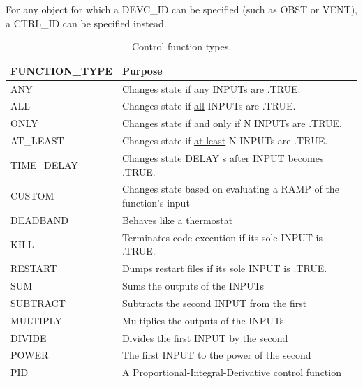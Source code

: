 \documentclass[11pt]{book}
\begin{document}
For any object for which a {\ct DEVC\_ID} can be specified (such as {\ct OBST} or {\ct VENT}), a {\ct CTRL\_ID} can be
specified instead.

\begin{table}[h!]
\caption[Control function types]{Control function types.}
\label{tab:funcvalues}
\begin{center}
\begin{tabular}{|l||l|}
\hline
{\ct FUNCTION\_TYPE}              & Purpose   \\ \hline \hline
{\ct ANY}                         & Changes state if \underline{any} {\ct INPUT}s are {\ct .TRUE.}  \\ \hline
{\ct ALL}                         & Changes state if \underline{all} {\ct INPUT}s are {\ct .TRUE.}  \\ \hline
{\ct ONLY}                        & Changes state if and \underline{only} if {\ct N} {\ct INPUT}s are {\ct .TRUE.}  \\ \hline
{\ct AT\_LEAST}                   & Changes state if \underline{at least} {\ct N} {\ct INPUT}s are {\ct .TRUE.}  \\ \hline
{\ct TIME\_DELAY}                 & Changes state {\ct DELAY} s after {\ct INPUT} becomes {\ct .TRUE.} \\ \hline
{\ct CUSTOM}                      & Changes state based on evaluating a {\ct RAMP} of the function's input \\ \hline
{\ct DEADBAND}                    & Behaves like a thermostat  \\ \hline
{\ct KILL}                        & Terminates code execution if its sole {\ct INPUT} is {\ct .TRUE.}  \\ \hline
{\ct RESTART}                     & Dumps restart files if its sole {\ct INPUT} is {\ct .TRUE.} \\ \hline
{\ct SUM}                         & Sums the outputs of the {\ct INPUT}s \\ \hline
{\ct SUBTRACT}                    & Subtracts the second {\ct INPUT} from the first \\ \hline
{\ct MULTIPLY}                    & Multiplies the outputs of the {\ct INPUT}s \\ \hline
{\ct DIVIDE}                      & Divides the first {\ct INPUT} by the second \\ \hline
{\ct POWER}                       & The first {\ct INPUT} to the power of the second \\ \hline
{\ct PID}                         & A Proportional-Integral-Derivative control function \\ \hline
\end{tabular}
\end{center}
\end{table}
\end{document}
